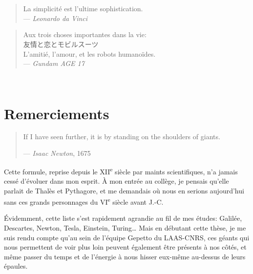 ~

\newpage

~

\vfill

\begin{quote}
    \par\raggedleft
    La simplicité est l'ultime sophistication. \\
    --- \emph{Leonardo da Vinci}

\end{quote}

\vfill

\begin{quote}
    \par\raggedleft
    Aux trois choses importantes dans la vie: \\
    {\LARGE 友情と恋とモビルスーツ} \\
    L'amitié, l'amour, et les robots humanoïdes. \\
    --- \emph{Gundam AGE 17}
\end{quote}

\vfill

\newpage

~

\newpage

\section*{Remerciements}

\begin{quote}
    If I have seen further, it is by standing on the shoulders of giants.
    \par\raggedleft--- \emph{Isaac Newton}, 1675
\end{quote}

Cette formule, reprise depuis le XII\textsuperscript{e} siècle par maints scientifiques, n'a jamais cessé d'évoluer
dans mon esprit. À mon entrée au collège, je pensais qu'elle parlait de Thalès et Pythagore, et me demandais où nous
en serions aujourd'hui sans ces grands personnages du VI\textsuperscript{e} siècle avant J.-C.

Évidemment, cette liste s'est rapidement agrandie au fil de mes études: Galilée, Descartes, Newton, Tesla, Einstein,
Turing\ldots{} Mais en débutant cette thèse, je me suis rendu compte qu'au sein de l'équipe Gepetto du LAAS-CNRS, ces
géants qui nous permettent de voir plus loin peuvent également être présents à nos côtés, et même passer du temps et de
l'énergie à nous hisser eux-même au-dessus de leurs épaules.

